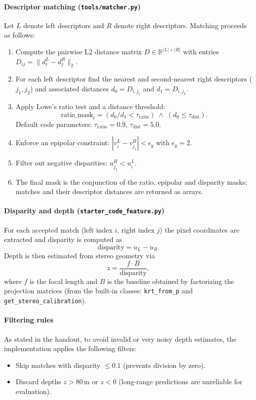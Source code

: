 \documentclass{rapport}
\begin{document}
\paragraph{Descriptor matching (\texttt{tools/matcher.py})}
Let $L$ denote left descriptors and $R$ denote right descriptors. Matching proceeds as follows:
\begin{enumerate}
    \item Compute the pairwise L2 distance matrix $D\in\mathbb{R}^{|L|\times|R|}$ with entries $D_{ij}=\lVert d^L_i-d^R_j\rVert_2$.
    \item For each left descriptor find the nearest and second-nearest right descriptors ($j_1, j_2$) and associated distances
        $d_0=D_{i,j_1}$ and $d_1=D_{i,j_2}$.
    \item Apply Lowe's ratio test and a distance threshold:
        \[\text{ratio\_mask}_i = (d_0/d_1 < \tau_{\mathrm{ratio}}) \;\wedge\; (d_0 \le \tau_{\mathrm{dist}}).\]
        Default code parameters: $\tau_{\mathrm{ratio}}=0.9$, $\tau_{\mathrm{dist}}=5.0$.
    \item Enforce an epipolar constraint: $|v^L_i - v^R_{j_1}| < \epsilon_y$ with $\epsilon_y=2$.
    \item Filter out negative disparities: $u^R_{j_1} < u^L_i$.
    \item The final mask is the conjunction of the ratio, epipolar and disparity masks; matches and their descriptor distances
        are returned as arrays.
\end{enumerate}

\paragraph{Disparity and depth (\texttt{starter\_code\_feature.py})}
For each accepted match (left index $i$, right index $j$) the pixel coordinates are extracted and disparity is computed as
\[\text{disparity} = u_L - u_R.\]
Depth is then estimated from stereo geometry via
\[ z = \frac{f\cdot B}{\text{disparity}},\]
where $f$ is the focal length and $B$ is the baseline obtained by factorizing the projection matrices
(from the built-in classes: \texttt{krt\_from\_p} and \texttt{get\_stereo\_calibration}).

\paragraph{Filtering rules}
As stated in the handout, to avoid invalid or very noisy depth estimates, the implementation applies the following filters:
\begin{itemize}
    \item Skip matches with disparity $\le 0.1$ (prevents division by zero).
    \item Discard depths $z>80\,$m or $z<0$ (long-range predictions are unreliable for evaluation).
\end{itemize}
\end{document}
